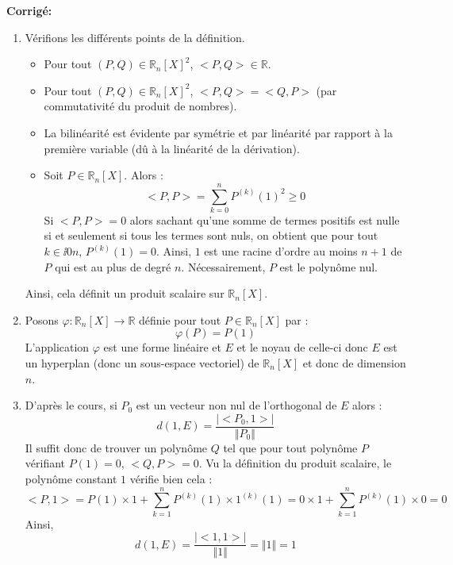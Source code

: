 \documentclass[a4paper,twoside,french,11pt]{VcCours}
\newcommand{\corr}{\textbf{Corrigé:}}
\begin{document}
\corr \begin{enumerate}
\item Vérifions les différents points de la définition.

\begin{itemize}
\item Pour tout $(P,Q) \in \mathbb{R}_n[X]^2$, $<P,Q> \in \mathbb{R}$.
\item Pour tout $(P,Q) \in \mathbb{R}_n[X]^2$, $<P,Q>= <Q,P>$ (par commutativité du produit de nombres).
\item La bilinéarité est évidente par symétrie et par linéarité par rapport à la première variable (dû à la linéarité de la dérivation).
\item Soit $P \in \mathbb{R}_n[X]$. Alors :
$$ <P,P> = \sum_{k=0}^{n} P^{(k)}(1)^2 \geq 0$$
Si $<P,P>=0$ alors sachant qu'une somme de termes positifs est nulle si et seulement si tous les termes sont nuls, on obtient que pour tout $k \in \ii{0}{n}$, $P^{(k)}(1)=0$. Ainsi, $1$ est une racine d'ordre au moins $n+1$ de $P$ qui est au plus de degré $n$. Nécessairement, $P$ est le polynôme nul. 
\end{itemize}
Ainsi, cela définit un produit scalaire sur $\mathbb{R}_n[X]$.
\item Posons $\varphi : \mathbb{R}_n[X] \rightarrow \mathbb{R}$ définie pour tout $P \in \mathbb{R}_n[X]$ par :
$$ \varphi(P)= P(1)$$
L'application $\varphi$ est une forme linéaire et $E$ et le noyau de celle-ci donc $E$ est un hyperplan (donc un sous-espace vectoriel) de $\mathbb{R}_n[X]$ et donc de dimension $n$.
\item D'après le cours, si $P_0$ est un vecteur non nul de l'orthogonal de $E$ alors :
$$ d(1,E) = \dfrac{\vert <P_0,1> \vert }{\Vert P_0 \Vert}$$
Il suffit donc de trouver un polynôme $Q$ tel que pour tout polynôme $P$ vérifiant $P(1)=0$, $<Q,P>=0$. Vu la définition du produit scalaire, le polynôme constant $1$ vérifie bien cela :
$$ <P,1> = P(1) \times 1 + \sum_{k=1}^n P^{(k)}(1) \times 1^{(k)}(1) = 0\times 1 + \sum_{k=1}^n P^{(k)}(1) \times 0 = 0$$
Ainsi,
$$ d(1,E) = \dfrac{\vert <1,1> \vert }{\Vert 1 \Vert} = \Vert 1 \Vert = 1$$
\end{enumerate}
\end{document}
